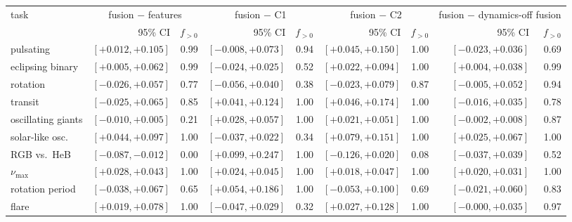 \begin{tabular}{lrrrrrrrr}
\toprule
task & \multicolumn{2}{c}{fusion $-$ features} & \multicolumn{2}{c}{fusion $-$ C1} & \multicolumn{2}{c}{fusion $-$ C2} & \multicolumn{2}{c}{fusion $-$ dynamics-off fusion} \\
 & 95\% CI & $f_{>0}$ & 95\% CI & $f_{>0}$ & 95\% CI & $f_{>0}$ & 95\% CI & $f_{>0}$ \\
\midrule
pulsating & $\mathbf{[+0.012, +0.105]}$ & 0.99 & $[-0.008, +0.073]$ & 0.94 & $\mathbf{[+0.045, +0.150]}$ & 1.00 & $[-0.023, +0.036]$ & 0.69 \\
eclipsing binary & $\mathbf{[+0.005, +0.062]}$ & 0.99 & $[-0.024, +0.025]$ & 0.52 & $\mathbf{[+0.022, +0.094]}$ & 1.00 & $\mathbf{[+0.004, +0.038]}$ & 0.99 \\
rotation & $[-0.026, +0.057]$ & 0.77 & $[-0.056, +0.040]$ & 0.38 & $[-0.023, +0.079]$ & 0.87 & $[-0.005, +0.052]$ & 0.94 \\
transit & $[-0.025, +0.065]$ & 0.85 & $\mathbf{[+0.041, +0.124]}$ & 1.00 & $\mathbf{[+0.046, +0.174]}$ & 1.00 & $[-0.016, +0.035]$ & 0.78 \\
oscillating giants & $[-0.010, +0.005]$ & 0.21 & $\mathbf{[+0.028, +0.057]}$ & 1.00 & $\mathbf{[+0.021, +0.051]}$ & 1.00 & $[-0.002, +0.008]$ & 0.87 \\
solar-like osc. & $\mathbf{[+0.044, +0.097]}$ & 1.00 & $[-0.037, +0.022]$ & 0.34 & $\mathbf{[+0.079, +0.151]}$ & 1.00 & $\mathbf{[+0.025, +0.067]}$ & 1.00 \\
RGB vs.\ HeB & $\mathbf{[-0.087, -0.012]}$ & 0.00 & $\mathbf{[+0.099, +0.247]}$ & 1.00 & $[-0.126, +0.020]$ & 0.08 & $[-0.037, +0.039]$ & 0.52 \\
$\nu_{\max}$ & $\mathbf{[+0.028, +0.043]}$ & 1.00 & $\mathbf{[+0.024, +0.045]}$ & 1.00 & $\mathbf{[+0.018, +0.047]}$ & 1.00 & $\mathbf{[+0.020, +0.031]}$ & 1.00 \\
rotation period & $[-0.038, +0.067]$ & 0.65 & $\mathbf{[+0.054, +0.186]}$ & 1.00 & $[-0.053, +0.100]$ & 0.69 & $[-0.021, +0.060]$ & 0.83 \\
flare & $\mathbf{[+0.019, +0.078]}$ & 1.00 & $[-0.047, +0.029]$ & 0.32 & $\mathbf{[+0.027, +0.128]}$ & 1.00 & $[-0.000, +0.035]$ & 0.97 \\
\bottomrule
\end{tabular}
